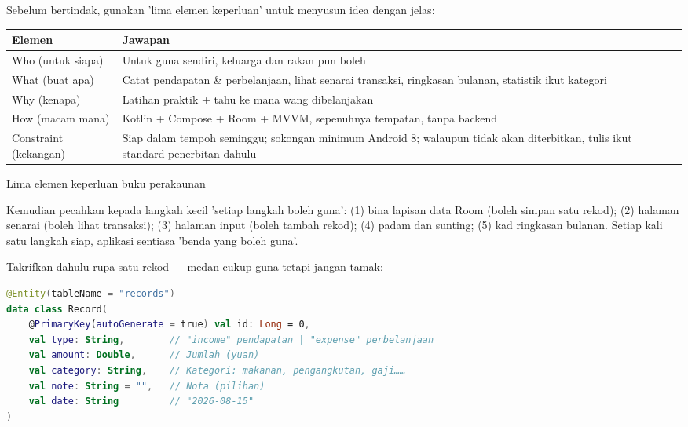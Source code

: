 


Sebelum bertindak, gunakan 'lima elemen keperluan' untuk menyusun idea dengan jelas:

\begin{center}
\begin{tabularx}{\linewidth}{|X|X|}
\hline
\textbf{Elemen} & \textbf{Jawapan} \tabularnewline
\hline
Who (untuk siapa) & Untuk guna sendiri, keluarga dan rakan pun boleh \tabularnewline
What (buat apa) & Catat pendapatan \& perbelanjaan, lihat senarai transaksi, ringkasan bulanan, statistik ikut kategori \tabularnewline
Why (kenapa) & Latihan praktik + tahu ke mana wang dibelanjakan \tabularnewline
How (macam mana) & Kotlin + Compose + Room + MVVM, sepenuhnya tempatan, tanpa backend \tabularnewline
Constraint (kekangan) & Siap dalam tempoh seminggu; sokongan minimum Android 8; walaupun tidak akan diterbitkan, tulis ikut standard penerbitan dahulu \tabularnewline
\hline
\end{tabularx}
\end{center}

\begin{center}\small\color{gray}Lima elemen keperluan buku perakaunan\end{center}

Kemudian pecahkan kepada langkah kecil 'setiap langkah boleh guna': (1) bina lapisan data Room (boleh simpan satu rekod); (2) halaman senarai (boleh lihat transaksi); (3) halaman input (boleh tambah rekod); (4) padam dan sunting; (5) kad ringkasan bulanan. Setiap kali satu langkah siap, aplikasi sentiasa 'benda yang boleh guna'.


Takrifkan dahulu rupa satu rekod — medan cukup guna tetapi jangan tamak:

\begin{lstlisting}[language=Kotlin]
@Entity(tableName = "records")
data class Record(
    @PrimaryKey(autoGenerate = true) val id: Long = 0,
    val type: String,        // "income" pendapatan | "expense" perbelanjaan
    val amount: Double,      // Jumlah (yuan)
    val category: String,    // Kategori: makanan, pengangkutan, gaji……
    val note: String = "",   // Nota (pilihan)
    val date: String         // "2026-08-15"
)
\end{lstlisting}


